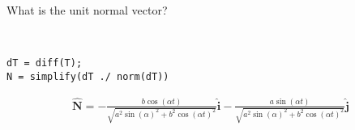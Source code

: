What is the unit normal vector?

\begin{solution} \
\begin{lstlisting}
dT = diff(T);
N = simplify(dT ./ norm(dT))
\end{lstlisting}

\begin{align*}
    \hat{\boldsymbol{N}} = -\frac{b \cos(\alpha t)}{\sqrt{a^2 \sin(\alpha)^2 + b^2 \cos(\alpha t)^2}} \hat{\boldsymbol{i}} - \frac{a \sin(\alpha t)}{\sqrt{a^2 \sin(\alpha)^2 + b^2 \cos(\alpha t)^2}} \hat{\boldsymbol{j}}
\end{align*}
\end{solution}